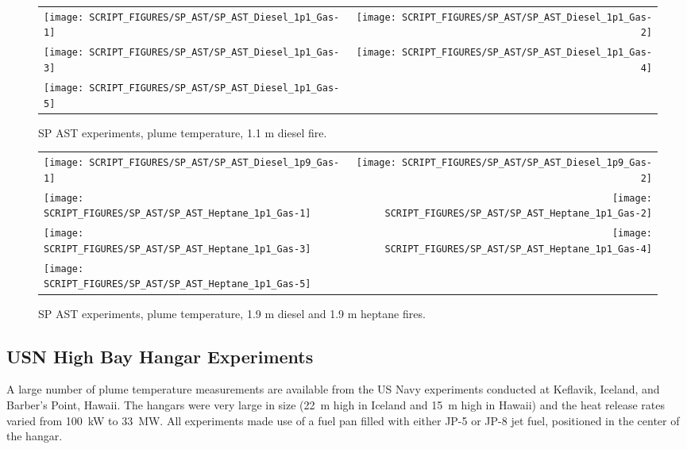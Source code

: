 \begin{figure}[!h]
\begin{tabular*}{\textwidth}{l@{\extracolsep{\fill}}r}
\texttt{[image: SCRIPT\_FIGURES/SP\_AST/SP\_AST\_Diesel\_1p1\_Gas-1]}   &  \texttt{[image: SCRIPT\_FIGURES/SP\_AST/SP\_AST\_Diesel\_1p1\_Gas-2]}    \\
\texttt{[image: SCRIPT\_FIGURES/SP\_AST/SP\_AST\_Diesel\_1p1\_Gas-3]}   &  \texttt{[image: SCRIPT\_FIGURES/SP\_AST/SP\_AST\_Diesel\_1p1\_Gas-4]}     \\
\texttt{[image: SCRIPT\_FIGURES/SP\_AST/SP\_AST\_Diesel\_1p1\_Gas-5]}   &
\end{tabular*}
\caption[SP AST experiments, plume temperature, 1.1 m diesel fire]
{SP AST experiments, plume temperature, 1.1 m diesel fire.}
\label{SP_Diesel_1p1_Gas}
\end{figure}

\newpage

\begin{figure}[p]
\begin{tabular*}{\textwidth}{l@{\extracolsep{\fill}}r}
\texttt{[image: SCRIPT\_FIGURES/SP\_AST/SP\_AST\_Diesel\_1p9\_Gas-1]}   &  \texttt{[image: SCRIPT\_FIGURES/SP\_AST/SP\_AST\_Diesel\_1p9\_Gas-2]}    \\
\texttt{[image: SCRIPT\_FIGURES/SP\_AST/SP\_AST\_Heptane\_1p1\_Gas-1]}  &  \texttt{[image: SCRIPT\_FIGURES/SP\_AST/SP\_AST\_Heptane\_1p1\_Gas-2]}    \\
\texttt{[image: SCRIPT\_FIGURES/SP\_AST/SP\_AST\_Heptane\_1p1\_Gas-3]}  &  \texttt{[image: SCRIPT\_FIGURES/SP\_AST/SP\_AST\_Heptane\_1p1\_Gas-4]}     \\
\texttt{[image: SCRIPT\_FIGURES/SP\_AST/SP\_AST\_Heptane\_1p1\_Gas-5]}  &
\end{tabular*}
\caption[SP AST experiments, plume temperature, 1.9 m diesel and 1.1 m heptane fires]
{SP AST experiments, plume temperature, 1.9 m diesel and 1.9 m heptane fires.}
\label{SP_Diesel_1p9_Gas}
\end{figure}

\clearpage

\subsection{USN High Bay Hangar Experiments}

\label{USN_Plume}

A large number of plume temperature measurements are available from the US Navy experiments conducted at Keflavik, Iceland, and Barber's Point, Hawaii. The hangars were very large in size (22~m high in Iceland and 15~m high in Hawaii) and the heat release rates varied from 100~kW to 33~MW. All experiments made use of a fuel pan filled with either JP-5 or JP-8 jet fuel, positioned in the center of the hangar.


